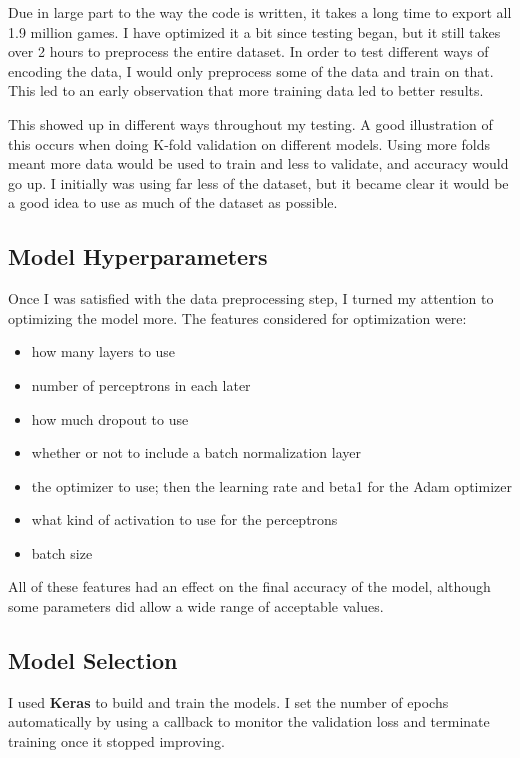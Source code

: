 \documentclass[twoside,twocolumn]{article}
\begin{document}
Due in large part to the way the code is written, it takes a long time to export all 1.9 million games.  I have optimized it a bit since testing began, but it still takes over 2 hours to preprocess the entire dataset.  In order to test different ways of encoding the data, I would only preprocess some of the data and train on that.  This led to an early observation that more training data led to better results.

This showed up in different ways throughout my testing.  A good illustration of this occurs when doing K-fold validation on different models.  Using more folds meant more data would be used to train and less to validate, and accuracy would go up.  I initially was using far less of the dataset, but it became clear it would be a good idea to use as much of the dataset as possible.

\subsection{Model Hyperparameters}

Once I was satisfied with the data preprocessing step, I turned my attention to optimizing the model more.  The features considered for optimization were:

\begin{itemize}
\item how many layers to use
\item number of perceptrons in each later
\item how much dropout to use
\item whether or not to include a batch normalization layer
\item the optimizer to use; then the learning rate and beta1 for the Adam optimizer
\item what kind of activation to use for the perceptrons
\item batch size
\end{itemize}

All of these features had an effect on the final accuracy of the model, although some parameters did allow a wide range of acceptable values.

\subsection{Model Selection}

I used \textbf{Keras} to build and train the models.  I set the number of epochs automatically by using a callback to monitor the validation loss and terminate training once it stopped improving.
\end{document}
